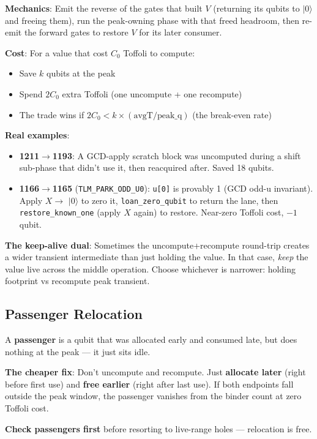 \documentclass[11pt,a4paper]{article}
\newcommand{\ket}[1]{$|#1\rangle$\xspace}
\newcommand{\tof}{Toffoli\xspace}
\begin{document}
\textbf{Mechanics}: Emit the reverse of the gates that built $V$ (returning its qubits to \ket{0}
and freeing them), run the peak-owning phase with that freed headroom, then re-emit the forward
gates to restore $V$ for its later consumer.

\textbf{Cost}: For a value that cost $C_0$ Toffoli to compute:
\begin{itemize}
  \item Save $k$ qubits at the peak
  \item Spend $2C_0$ extra Toffoli (one uncompute + one recompute)
  \item The trade wins if $2C_0 < k \times (\text{avgT} / \text{peak\_q})$ (the break-even rate)
\end{itemize}

\textbf{Real examples}:
\begin{itemize}
  \item \textbf{1211$\to$1193}: A GCD-apply scratch block was uncomputed during a shift sub-phase
    that didn't use it, then reacquired after. Saved 18 qubits.
  \item \textbf{1166$\to$1165} (\texttt{TLM\_PARK\_ODD\_U0}): \texttt{u[0]} is provably 1 (GCD
    odd-u invariant). Apply $X \to$ \ket{0} to zero it, \texttt{loan\_zero\_qubit} to return the
    lane, then \texttt{restore\_known\_one} (apply $X$ again) to restore. Near-zero \tof cost,
    $-1$ qubit.
\end{itemize}

\textbf{The keep-alive dual}: Sometimes the uncompute+recompute round-trip creates a wider
transient intermediate than just holding the value. In that case, \emph{keep} the value live
across the middle operation. Choose whichever is narrower: holding footprint vs recompute peak
transient.

\subsection{Passenger Relocation}

A \textbf{passenger} is a qubit that was allocated early and consumed late, but does nothing at
the peak --- it just sits idle.

\textbf{The cheaper fix}: Don't uncompute and recompute. Just \textbf{allocate later} (right
before first use) and \textbf{free earlier} (right after last use). If both endpoints fall
outside the peak window, the passenger vanishes from the binder count at zero \tof cost.

\textbf{Check passengers first} before resorting to live-range holes --- relocation is free.
\end{document}

